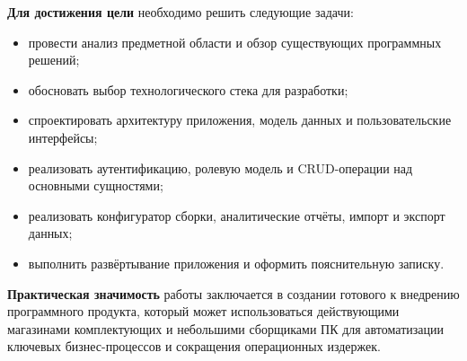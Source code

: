 \textbf{Для достижения цели} необходимо решить следующие задачи:
\begin{itemize}
    \item провести анализ предметной области и обзор существующих программных решений;
    \item обосновать выбор технологического стека для разработки;
    \item спроектировать архитектуру приложения, модель данных и пользовательские интерфейсы;
    \item реализовать аутентификацию, ролевую модель и CRUD-операции над основными сущностями;
    \item реализовать конфигуратор сборки, аналитические отчёты, импорт и экспорт данных;
    \item выполнить развёртывание приложения и оформить пояснительную записку.
\end{itemize}

\textbf{Практическая значимость} работы заключается в создании готового к внедрению программного продукта, который может использоваться действующими магазинами комплектующих и небольшими сборщиками ПК для автоматизации ключевых бизнес-процессов и сокращения операционных издержек.
